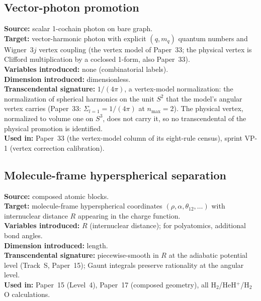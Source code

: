 \documentclass[11pt]{article}
\begin{document}
\subsection{Vector-photon promotion}
\label{sec:proj_vector_photon}
\textbf{Source:} scalar 1-cochain photon on bare graph.\\
\textbf{Target:} vector-harmonic photon with explicit $(q, m_q)$
quantum numbers and Wigner~$3j$ vertex coupling (the vertex model of
Paper~33; the physical vertex is Clifford multiplication by a coclosed
1-form, also Paper~33).\\
\textbf{Variables introduced:} none (combinatorial labels).\\
\textbf{Dimension introduced:} dimensionless.\\
\textbf{Transcendental signature:} $1/(4\pi)$, a vertex-model
normalization: the normalization of spherical harmonics on the unit
$S^2$ that the model's angular vertex carries (Paper~33:
$\Sigma_{l=1} = 1/(4\pi)$ at $n_{\max} = 2$).  The physical vertex,
normalized to volume one on $S^3$, does not carry it, so no
transcendental of the physical promotion is identified.\\
\textbf{Used in:} Paper~33 (the vertex-model column of its eight-rule
census), sprint VP-1 (vertex correction calibration).

\subsection{Molecule-frame hyperspherical separation}
\label{sec:proj_molframe}
\textbf{Source:} composed atomic blocks.\\
\textbf{Target:} molecule-frame hyperspherical coordinates
$(\rho, \alpha, \theta_{12}, \ldots)$ with internuclear distance $R$
appearing in the charge function.\\
\textbf{Variables introduced:} $R$ (internuclear distance); for
polyatomics, additional bond angles.\\
\textbf{Dimension introduced:} length.\\
\textbf{Transcendental signature:} piecewise-smooth in $R$ at the
adiabatic potential level (Track~S, Paper~15); Gaunt integrals
preserve rationality at the angular level.\\
\textbf{Used in:} Paper~15 (Level~4), Paper~17 (composed geometry),
all H$_2$/HeH$^+$/H$_2$O calculations.
\end{document}
